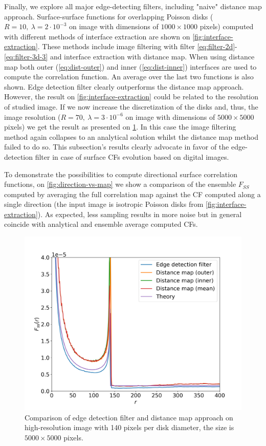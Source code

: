 \documentclass[reprint,amsmath,amssymb,aps,pre,showkeys,showpacs]{revtex4-1}
\begin{document}
Finally, we explore all major edge-detecting filters, including "naive" distance
map approach. Surface-surface functions for overlapping Poisson disks
($R = 10,\ \lambda = 2 \cdot 10^{-3}$ on image with dimensions of $1000 \times 1000$
pixels) computed with different methods of interface extraction are shown on
\cref{fig:interface-extraction}. These methods include image filtering with
filter \cref{eq:filter-2d}-\cref{eq:filter-3d-3} and interface extraction with
distance map. When using distance map both outer (\cref{eq:dist-outer}) and
inner (\cref{eq:dist-inner}) interfaces are used to compute the correlation
function. An average over the last two functions is also shown. Edge detection
filter clearly outperforms the distance map approach. However, the result on
\cref{fig:interface-extraction} could be related to the resolution of studied
image. If we now increase the discretization of the disks and, thus, the image
resolution ($R = 70,\ \lambda = 3 \cdot 10^{-6}$ on image with dimensions of
$5000 \times 5000$ pixels) we get the result as presented on
\cref{fig:sobel-vs-distance-map}. In this case the image filtering method again
collapses to an analytical solution whilst the distance map method failed to do
so. This subsection's results clearly advocate in favor of the edge-detection
filter in case of surface CFs evolution based on digital images.

To demonstrate the possibilities to compute directional surface correlation
functions, on \cref{fig:direction-vs-map} we show a comparison of the ensemble
$F_{SS}$ computed by averaging the full correlation map against the CF computed
along a single direction (the input image is isotropic Poisson disks from
\cref{fig:interface-extraction}). As expected, less sampling results in more
noise but in general coincide with analytical and ensemble average computed
CFs.

\begin{figure}[ht]
  \centering
  \includegraphics[width=\linewidth]{images/sobel-vs-distance-map.png}
  \caption{Comparison of edge detection filter and distance map approach on
    high-resolution image with 140 pixels per disk diameter, the size is
    $5000 \times 5000$ pixels.}
  \label{fig:sobel-vs-distance-map}
\end{figure}
\end{document}
